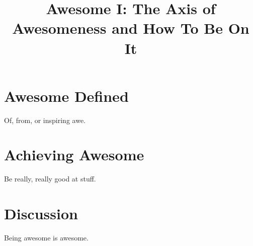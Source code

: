 \documentclass{article}
\begin{document}
\title{Awesome I: The Axis of Awesomeness and How To Be On It}

\section{Awesome Defined}

Of, from, or inspiring awe.

\section{Achieving Awesome}

Be really, really good at stuff.

\section{Discussion}

Being awesome is awesome.
\end{document}
